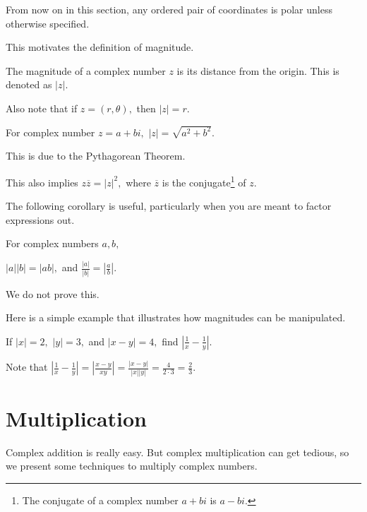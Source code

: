 \documentclass[mast]{lucky}
\begin{document}
From now on in this section, any ordered pair of coordinates is polar unless otherwise specified.

This motivates the definition of magnitude.

\begin{defi}[Magnitude]
The magnitude of a complex number $z$ is its distance from the origin. This is denoted as $|z|.$

Also note that if $z=(r,\theta),$ then $|z|=r.$
\end{defi}

\begin{fact}[$|z|=\sqrt{a^2+b^2}$]
For complex number $z=a+bi,$ $|z|=\sqrt{a^2+b^2}.$
\end{fact}

This is due to the Pythagorean Theorem.

\begin{corollary}
This also implies $z\overline{z}=|z|^2,$ where $\overline{z}$ is the conjugate\footnote{The conjugate of a complex number $a+bi$ is $a-bi.$} of $z.$
\end{corollary}

The following corollary is useful, particularly when you are meant to factor expressions out.

\begin{fact}
For complex numbers $a,b,$
\begin{itemize}
\Item $|a||b|=|ab|,$ and
\Item $\frac{|a|}{|b|}=|\frac{a}{b}|.$
\end{itemize}
\end{fact}

We do not prove this.

Here is a simple example that illustrates how magnitudes can be manipulated.

\begin{exam}
If $|x|=2,$ $|y|=3,$ and $|x-y|=4,$ find $|\frac{1}{x}-\frac{1}{y}|.$
\end{exam}

\begin{sol}
Note that $|\frac{1}{x}-\frac{1}{y}|=|\frac{x-y}{xy}|=\frac{|x-y|}{|x||y|}=\frac{4}{2\cdot 3}=\frac{2}{3}.$
\end{sol}

\section{Multiplication}

Complex addition is really easy. But complex multiplication can get tedious, so we present some techniques to multiply complex numbers.
\end{document}
